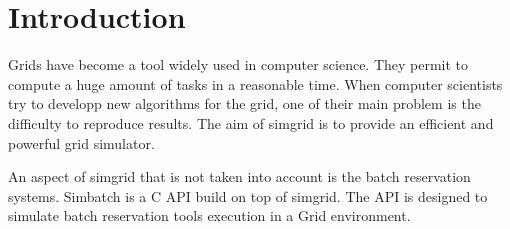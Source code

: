 \section{Introduction}

Grids have become a tool widely used in computer science. They permit
to compute a huge amount of tasks in a reasonable time. When computer
scientists try to developp new algorithms for the grid, one of their
main problem is the difficulty to reproduce results. The aim of
simgrid \cite{simgrid} is to provide an efficient and powerful grid
simulator.

An aspect of simgrid that is not taken into account is the batch
reservation systems. Simbatch is a C API build on top of simgrid. The
API is designed to simulate batch reservation tools execution in a
Grid environment.
